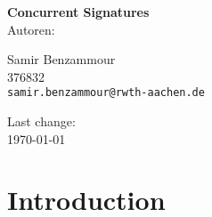 \documentclass[a4paper, 12pt]{article}
\title{ }
\begin{document}
\begin{center}
	\begin{LARGE}
		\textbf{Concurrent Signatures}\\[2em]
		Autoren:
	\end{LARGE}
	\begin{large}
		\begin{center}
			Samir Benzammour \\ 376832 \\ \texttt{samir.benzammour@rwth-aachen.de}
		\end{center}
	\end{large}	
	\vfill
	\vfill
	\vfill
	\vfill
	\begin{large}
		Last change:\\
		\today\\
	\end{large}
	\vfill
\end{center}
\newpage
\tableofcontents
\newpage

\section{Introduction}



\end{document}
